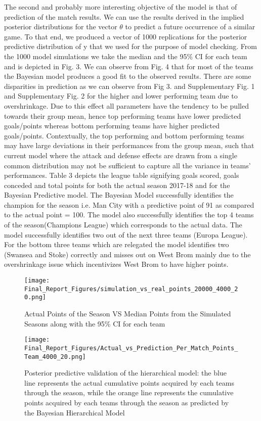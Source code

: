 \documentclass{article}
\begin{document}
The second and probably more interesting objective of the model is that of prediction of the match results. We can use the results derived in the implied posterior distributions for the vector $\theta$ to predict a future occurrence of a similar game. To that end, we produced a vector of 1000 replications for the posterior predictive distribution of y that we used for the purpose of model checking. From the 1000 model simulations we take the median and the 95\% CI for each team and is depicted in Fig. 3. We can observe from Fig. 4 that for most of the teams the Bayesian model produces a good fit to the observed results. There are some disparities in prediction as we can observe from Fig 3. and Supplementary Fig. 1 and Supplementary Fig. 2 for the higher and lower performing team due to overshrinkage. Due to this effect all parameters have the tendency to be pulled towards their group mean, hence top performing teams have lower predicted goals/points whereas bottom performing teams have higher predicted goals/points. Contextually, the top performing and bottom performing teams may have large deviations in their performances from the group mean, such that current model where the attack and defense effects are drawn from a single common distribution may not be sufficient to capture all the variance in teams’ performances. Table 3 depicts the league table signifying goals scored, goals conceded and total points for both the actual season 2017-18 and for the Bayesian Predictive model. The Bayesian Model successfully identifies the champion for the season i.e. Man City with a predictive point of 91 as compared to the actual point = 100. The model also successfully identifies the top 4 teams of the season(Champions League) which corresponds to the actual data. The model successfully identifies two out of the next three teams (Europa League). For the bottom three teams which are relegated the model identifies two (Swansea and Stoke) correctly and misses out on West Brom mainly due to the overshrinkage issue which incentivizes West Brom to have higher points.


\begin{figure*}[!htb]
\centering
\texttt{[image: Final\_Report\_Figures/simulation\_vs\_real\_points\_20000\_4000\_20.png]}
\caption{Actual Points of the Season VS Median Points from the Simulated Seasons along with the 95\% CI for each team}
\label{fig:actual_simulation_points_barplot}
\end{figure*}

\begin{figure*}[!htb]
\centering
\texttt{[image: Final\_Report\_Figures/Actual\_vs\_Prediction\_Per\_Match\_Points\_Team\_4000\_20.png]}
\caption{Posterior predictive validation of the hierarchical model: the blue line represents the actual cumulative points acquired by each teams through the season, while the orange line represents the cumulative points  acquired by each teams through the season as predicted by the Bayesian Hierarchical Model}
\label{fig:actual_simulation_points_per_match}
\end{figure*}
\end{document}
